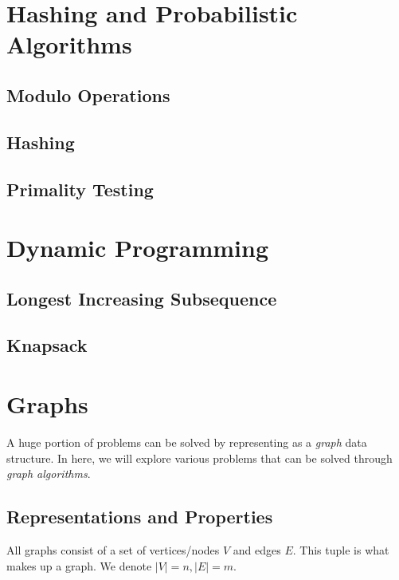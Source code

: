 \documentclass{article}
\begin{document}
\section{Hashing and Probabilistic Algorithms}

  \subsection{Modulo Operations}
  
  \subsection{Hashing}

  \subsection{Primality Testing}

\section{Dynamic Programming}

  \subsection{Longest Increasing Subsequence}

  \subsection{Knapsack}

\section{Graphs}

    A huge portion of problems can be solved by representing as a \textit{graph} data structure. In here, we will explore various problems that can be solved through \textit{graph algorithms}. 

  \subsection{Representations and Properties}

    All graphs consist of a set of vertices/nodes $V$ and edges $E$. This tuple is what makes up a graph. We denote $|V| = n, |E| = m$. 
\end{document}
